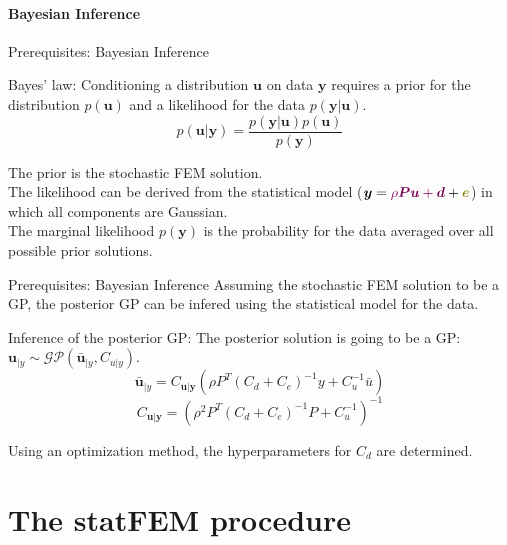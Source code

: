 \documentclass[fleqn,11pt,aspectratio=43]{beamer}
\begin{document}
\subsection{Bayesian Inference}
\begin{frame}{Prerequisites: Bayesian Inference}
\begin{block}{Bayes' law:}
Conditioning a distribution $\bm{u}$ on data $\bm{y}$ requires a prior for the distribution $p(\bm{u})$ and a likelihood for the data $p(\bm{y}|\bm{u})$.
\begin{equation}
p(\bm{u}|\bm{y}) = \frac{p(\bm{y}|\bm{u})p(\bm{u})}{p(\bm{y})}
\end{equation}
\end{block}
The prior is the stochastic FEM solution.\\
The likelihood can be derived from the statistical model ($\bm{y} = \textcolor{DGTU}{\rho \bm{P} \bm{u} + \bm{d}} + \textcolor{olive}{\bm{e}}$) in which all components are Gaussian.\\
The marginal likelihood $p(\bm{y})$ is the probability for the data averaged over all possible prior solutions.
\end{frame}



\begin{frame}{Prerequisites: Bayesian Inference}
Assuming the stochastic FEM solution to be a GP, the posterior GP can be infered using the statistical model for the data.
\begin{block}{Inference of the posterior GP:}
The posterior solution is going to be a GP: \\
$\bm{u}_{|y} \sim \mathcal{GP}(\bar{\bm{u}}_{|y}, C_{u|y})$.
\begin{equation}
\bm{\bar{u}}_{|y} = C_{\bm{u}|\bm{y}} \left(   \rho P^T  (C_d + C_e)^{-1}  y  +  C_u^{-1}  \bar{u}   \right)
\end{equation}
\begin{equation}
C_{\bm{u}|\bm{y}} = \left(      \rho^2  P^T   (C_d + C_e)^{-1}  P  +  C_u^{-1}    \right)^{-1} 
\end{equation}
\end{block}
Using an optimization method, the hyperparameters for $C_d$ are determined.

\end{frame}


\part{The statFEM procedure}
\begin{frame}[plain]
  \partpage
\end{frame}
\end{document}
